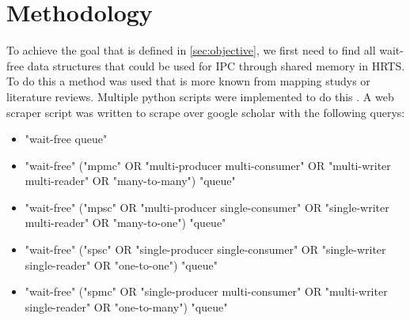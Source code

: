 \chapter{Methodology}\label{ch:methodology}
To achieve the goal that is defined in \cref{sec:objective}, we first need to find all wait-free data structures that could be used for \ac{IPC} through shared memory in \ac{HRTS}. To do this a method was used that is more known from mapping studys or literature reviews. Multiple python scripts were implemented to do this \cite{githubMA}. A web scraper script was written to scrape over google scholar with the following querys:
\begin{itemize}
   \item "wait-free queue"
   \item "wait-free" ("mpmc" OR "multi-producer multi-consumer" OR "multi-writer multi-reader" OR "many-to-many") "queue"
   \item "wait-free" ("mpsc" OR "multi-producer single-consumer" OR "single-writer multi-reader" OR "many-to-one") "queue"
   \item "wait-free" ("spsc" OR "single-producer single-consumer" OR "single-writer single-reader" OR "one-to-one") "queue"
   \item "wait-free" ("spmc" OR "single-producer multi-consumer" OR "multi-writer single-reader" OR "one-to-many") "queue"
\end{itemize}
